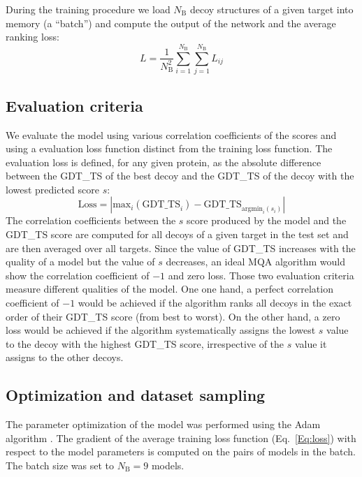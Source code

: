 \documentclass{bioinfo}
\begin{document}
During the training procedure we load $N_\text{B}$ decoy structures of
a given target into memory (a ``batch'') and compute the output of the
network and the average ranking loss:
\begin{equation}
L = \frac{1}{N_\text{B}^2} \sum_{i=1}^{N_\text{B}}\sum_{j=1}^{N_\text{B}} L_{ij}
\label{Eq:loss}
\end{equation}


\subsection{Evaluation criteria}

We evaluate the model using various correlation coefficients of the
scores and using a evaluation loss function distinct from the training loss
function. The evaluation loss is defined, for any given protein, as the
absolute difference between the GDT\_TS of the best decoy and the
GDT\_TS of the decoy with the lowest predicted score $s$:
\begin{equation}
\mathrm{Loss} = \left| \mathrm{max}_i(\text{GDT\_TS}_i) - \text{GDT\_TS}_{\mathrm{argmin}_i(s_i)} \right|
\label{Eq:eloss}
\end{equation}
The correlation coefficients between the $s$ score produced by the
model and the GDT\_TS score are computed for all decoys of a given
target in the test set and are then averaged over all targets. Since
the value of GDT\_TS increases with the quality of a model but the
value of $s$ decreases, an ideal MQA algorithm would show the correlation
coefficient of $-1$ and zero loss.
Those two evaluation criteria measure different qualities of the
model. One one hand, a perfect correlation coefficient of $-1$ would
be achieved if the algorithm ranks all decoys in the exact
order of their GDT\_TS score (from best to worst). On the other hand,
a zero loss would be achieved if the algorithm systematically assigns
the lowest $s$ value to the decoy with the highest GDT\_TS score,
irrespective of the $s$ value it assigns to the other decoys.


\subsection{Optimization and dataset sampling}

The parameter optimization of the model was performed using the Adam
algorithm \citep{kingma2014adam}. The gradient of the 
average training loss function (Eq.~\ref{Eq:loss})
with respect to the model parameters is computed on the pairs of
models in the batch. The batch size was set to $N_\text{B} = 9$
models.
\end{document}
